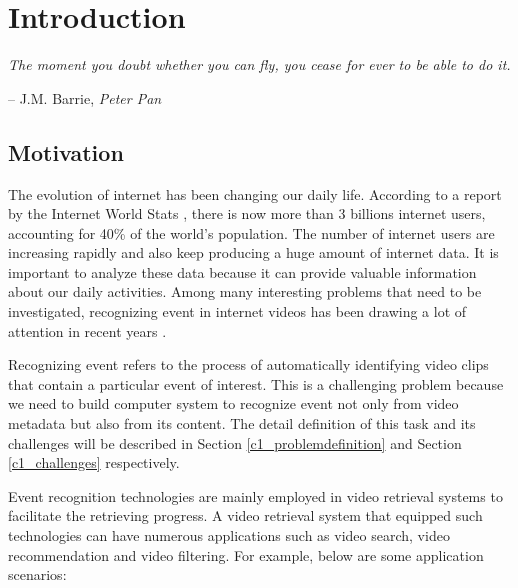 \chapter{Introduction}
\label{chapter1}

\epigraph{\textit{The moment you doubt whether you can fly, you cease for ever to be able to do it.}}{ -- J.M. Barrie, \textit{Peter Pan}}


\ifpdf
    \graphicspath{{Chapter1/Figs/Raster/}{Chapter1/Figs/PDF/}{Chapter1/Figs/}}
\else
    \graphicspath{{Chapter1/Figs/Vector/}{Chapter1/Figs/}}
\fi

\section{Motivation}
The evolution of internet has been changing our daily life. According to a report by the Internet World Stats \cite{Internet1}, there is now more than 3 billions internet users, accounting for 40\% of the world's population. The number of internet users are increasing rapidly and also keep producing a huge amount of internet data. It is important to analyze these data because it can provide valuable information about our daily activities. Among many interesting problems that need to be investigated, recognizing event in internet videos has been drawing a lot of attention in recent years \cite{natarajan2012multimodal,sun2013large,habibian2013recommendations,myers2014evaluating}. 

Recognizing event refers to the process of automatically identifying video clips that contain a particular event of interest. This is a challenging problem because we need to build computer system to recognize event not only from video metadata but also from its content. The detail definition of this task and its challenges will be described in Section \ref{c1_problemdefinition} and Section \ref{c1_challenges} respectively. 

Event recognition technologies are mainly employed in  video retrieval systems to facilitate the retrieving progress. A video retrieval system that equipped such technologies can have numerous applications such as video search, video recommendation and video filtering. For example, below are some application scenarios:

